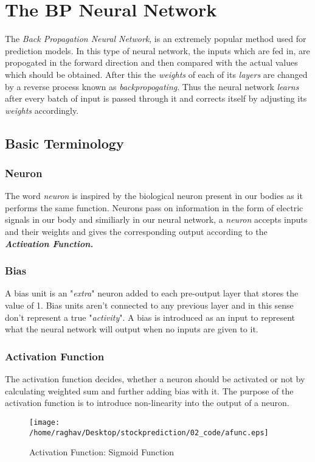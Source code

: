 \documentclass[12pt]{report}
\begin{document}

\newpage
\section{The BP Neural Network}

The \textit{Back Propagation Neural Network}, is an extremely popular method used for prediction models. In this type of neural network, the inputs which are fed in, are propogated in the forward direction and then compared with the actual values which should be obtained. After this the \textit{weights} of each of its \textit{layers} are changed by a reverse process known as \textit{backpropogating}. Thus the neural network \textit{learns} after every batch of input is passed through it and corrects itself by adjusting its \textit{weights} accordingly.


\subsection{Basic Terminology}
\subsubsection{Neuron}
The word \textit{neuron} is inspired by the biological neuron present in our bodies as it performs the same function. Neurons pass on information in the form of electric signals in our body and similiarly in our neural network, a \textit{neuron} accepts inputs and their weights and gives the corresponding output according to the \textbf{\textit{Activation Function.}} 

\subsubsection{Bias}
A bias unit is an "\textit{extra}" neuron added to each pre-output layer that stores the value of 1. Bias units aren't connected to any previous layer and in this sense don't represent a true "\textit{activity}". A bias is introduced as an input to represent what the neural network will output when no inputs are given to it.

\subsubsection{Activation Function}
The activation function decides, whether a neuron should be activated or not by calculating weighted sum and further adding bias with it. The purpose of the activation function is to introduce non-linearity into the output of a neuron.
\begin{figure}
\texttt{[image: /home/raghav/Desktop/stockprediction/02\_code/afunc.eps]}
\caption{Activation Function: Sigmoid Function}
\end{figure}
\end{document}
